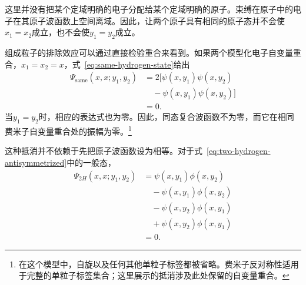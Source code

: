 这里并没有把某个定域明确的电子分配给某个定域明确的原子。束缚在原子中的电子在其原子波函数上空间离域。因此，让两个原子具有相同的原子态并不会使\(x_1=x_2\)成立，也不会使\(y_1=y_2\)成立。

组成粒子的排除效应可以通过直接检验重合来看到。如果两个模型化电子自变量重合，\(x_1=x_2=x\)，式~\eqref{eq:same-hydrogen-state}给出
\begin{align}
\Psi_{\mathrm{same}}(x,x;y_1,y_2)
&=2\bigl[
\psi(x,y_1)\psi(x,y_2)\nonumber\\
&\quad{}-\psi(x,y_1)\psi(x,y_2)
\bigr]\\
&=0.
\end{align}
当\(y_1=y_2\)时，相应的表达式也为零。因此，同态复合波函数不为零，而它在相同费米子自变量重合处的振幅为零。\footnote{在这个模型中，自旋以及任何其他单粒子标签都被省略。费米子反对称性适用于完整的单粒子标签集合；这里展示的抵消涉及此处保留的自变量重合。}

\begin{classroomqa}
\end{classroomqa}

\begin{classroomqa}
\end{classroomqa}

这种抵消并不依赖于先把原子波函数设为相等。对于式~\eqref{eq:two-hydrogen-antisymmetrized}中的一般态，
\begin{align}
\Psi_{2H}(x,x;y_1,y_2)
&=\psi(x,y_1)\phi(x,y_2)\nonumber\\
&\quad{}-\psi(x,y_1)\phi(x,y_2)\nonumber\\
&\quad{}-\psi(x,y_2)\phi(x,y_1)\nonumber\\
&\quad{}+\psi(x,y_2)\phi(x,y_1)\\
&=0.
\end{align}

\begin{classroomqa}
\end{classroomqa}

